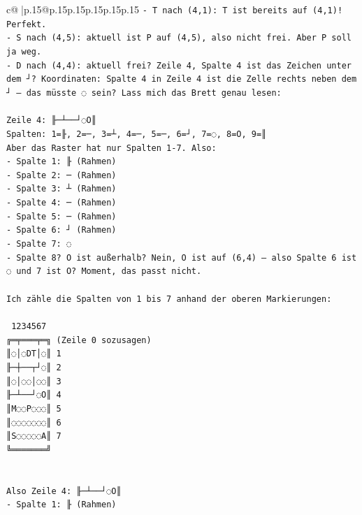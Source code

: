 \documentclass{article}
\begin{document}
{\begin{supertabular}{c@{$\;$}|p{.15\linewidth}@{}p{.15\linewidth}p{.15\linewidth}p{.15\linewidth}p{.15\linewidth}p{.15\linewidth}}
{{{\texttt{{-} T nach (4,1): T ist bereits auf (4,1)! Perfekt.} \\
\texttt{{-} S nach (4,5): aktuell ist P auf (4,5), also nicht frei. Aber P soll ja weg.} \\
\texttt{{-} D nach (4,4): aktuell frei? Zeile 4, Spalte 4 ist das Zeichen unter dem ┘? Koordinaten: Spalte 4 in Zeile 4 ist die Zelle rechts neben dem ┘ – das müsste ◌ sein? Lass mich das Brett genau lesen:} \\
\\ 
\texttt{Zeile 4: ╟─┴──┘◌O║} \\
\texttt{Spalten: 1=╟, 2=─, 3=┴, 4=─, 5=─, 6=┘, 7=◌, 8=O, 9=║} \\
\texttt{Aber das Raster hat nur Spalten 1{-}7. Also:} \\
\texttt{{-} Spalte 1: ╟ (Rahmen)} \\
\texttt{{-} Spalte 2: ─ (Rahmen)} \\
\texttt{{-} Spalte 3: ┴ (Rahmen)} \\
\texttt{{-} Spalte 4: ─ (Rahmen)} \\
\texttt{{-} Spalte 5: ─ (Rahmen)} \\
\texttt{{-} Spalte 6: ┘ (Rahmen)} \\
\texttt{{-} Spalte 7: ◌} \\
\texttt{{-} Spalte 8? O ist außerhalb? Nein, O ist auf (6,4) – also Spalte 6 ist ◌ und 7 ist O? Moment, das passt nicht.} \\
\\ 
\texttt{Ich zähle die Spalten von 1 bis 7 anhand der oberen Markierungen:} \\
\\ 
\texttt{ 1234567} \\
\texttt{╔═╤═══╤═╗  (Zeile 0 sozusagen)} \\
\texttt{║◌│◌DT│◌║ 1} \\
\texttt{╟─┼──┬┘◌║ 2} \\
\texttt{║◌│◌◌│◌◌║ 3} \\
\texttt{╟─┴──┘◌O║ 4} \\
\texttt{║M◌◌P◌◌◌║ 5} \\
\texttt{║◌◌◌◌◌◌◌║ 6} \\
\texttt{║S◌◌◌◌◌A║ 7} \\
\texttt{╚═══════╝} \\
\\ 
\\ 
\texttt{Also Zeile 4: ╟─┴──┘◌O║} \\
\texttt{{-} Spalte 1: ╟ (Rahmen)} \\
}}}
\end{supertabular}}
\end{document}
